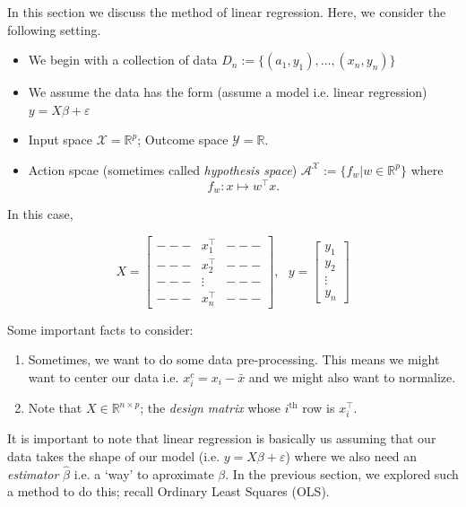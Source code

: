 In this section we discuss the method of linear regression. Here, we consider the following setting.

\begin{itemize}
    \item We begin with a collection of data $D_n := \{(a_1, y_1), \ldots, (x_n, y_n)\}$
    \item We assume the data has the form (assume a model i.e. linear regression) $y = X\beta + \varepsilon$
    \item Input space $\mathcal{X} = \mathbb{R}^p$; Outcome space $\mathcal{Y} = \mathbb{R}$.
    \item Action spcae (sometimes called \textit{hypothesis space}) $\mathcal{A}^{\mathcal{X}} := \{f_w \vert w \in \mathbb{R}^p\}$ where
    $$f_w : x \mapsto w^\top x. $$
\end{itemize}

In this case,

$$X = 
\begin{bmatrix}
  --- &  x_1^\top & ---  \\
  --- &  x_2^\top & --- \\
  --- &  \vdots & --- \\
  --- &  x_n^\top & ---
\end{bmatrix}, \text{  }
y = 
\begin{bmatrix}
y_1 \\ y_2 \\ \vdots \\ y_n    
\end{bmatrix}$$

\vspace{0.2cm}

\begin{remark}
    Some important facts to consider:
    \begin{enumerate}
        \item Sometimes, we want to do some data pre-processing. This means we might want to center our data i.e. $x_i^c = x_i - \bar{x}$ and we might
    also want to normalize.
        \item Note that $X \in \mathbb{R}^{n \times p}$; the \textit{design matrix} whose $i^{\text{th}}$ row is $x_i^\top$.
    \end{enumerate}
\end{remark}

It is important to note that linear regression is basically us assuming that our data takes the shape of our model (i.e. $y = X\beta + \varepsilon$) where
we also need an \textit{estimator} $\hat{\beta}$ i.e. a `way' to aproximate $\beta$. In the previous section, we explored such a method to do this; recall Ordinary Least Squares (OLS).

